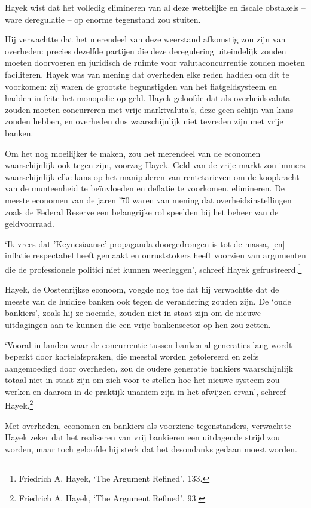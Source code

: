 \documentclass[
  a5paper,
  smalldemyvopaper,11pt,twoside,onecolumn,openright,extrafontsizes]{memoir}
\begin{document}
Hayek wist dat het volledig elimineren van al deze wettelijke en fiscale
obstakels -- ware deregulatie -- op enorme tegenstand zou stuiten.

Hij verwachtte dat het merendeel van deze weerstand afkomstig zou zijn
van overheden: precies dezelfde partijen die deze deregulering
uiteindelijk zouden moeten doorvoeren en juridisch de ruimte voor
valutaconcurrentie zouden moeten faciliteren. Hayek was van mening dat
overheden elke reden hadden om dit te voorkomen: zij waren de grootste
begunstigden van het fiatgeldsysteem en hadden in feite het monopolie op
geld. Hayek geloofde dat als overheidsvaluta zouden moeten concurreren
met vrije marktvaluta's, deze geen schijn van kans zouden hebben, en
overheden dus waarschijnlijk niet tevreden zijn met vrije banken.

Om het nog moeilijker te maken, zou het merendeel van de economen
waarschijnlijk ook tegen zijn, voorzag Hayek. Geld van de vrije markt
zou immers waarschijnlijk elke kans op het manipuleren van rentetarieven
om de koopkracht van de munteenheid te beïnvloeden en deflatie te
voorkomen, elimineren. De meeste economen van de jaren '70 waren van
mening dat overheidsinstellingen zoals de Federal Reserve een
belangrijke rol speelden bij het beheer van de geldvoorraad.

`Ik vrees dat 'Keynesiaanse' propaganda doorgedrongen is tot de massa,
{[}en{]} inflatie respectabel heeft gemaakt en onruststokers heeft
voorzien van argumenten die de professionele politici niet kunnen
weerleggen', schreef Hayek gefrustreerd.\footnote{Friedrich A. Hayek,
  `The Argument Refined', 133.}

Hayek, de Oostenrijkse econoom, voegde nog toe dat hij verwachtte dat de
meeste van de huidige banken ook tegen de verandering zouden zijn. De
`oude bankiers', zoals hij ze noemde, zouden niet in staat zijn om de
nieuwe uitdagingen aan te kunnen die een vrije bankensector op hen zou
zetten.

`Vooral in landen waar de concurrentie tussen banken al generaties lang
wordt beperkt door kartelafspraken, die meestal worden getolereerd en
zelfs aangemoedigd door overheden, zou de oudere generatie bankiers
waarschijnlijk totaal niet in staat zijn om zich voor te stellen hoe het
nieuwe systeem zou werken en daarom in de praktijk unaniem zijn in het
afwijzen ervan', schreef Hayek.\footnote{Friedrich A. Hayek, `The
  Argument Refined', 93.}

Met overheden, economen en bankiers als voorziene tegenstanders,
verwachtte Hayek zeker dat het realiseren van vrij bankieren een
uitdagende strijd zou worden, maar toch geloofde hij sterk dat het
desondanks gedaan moest worden.
\end{document}
